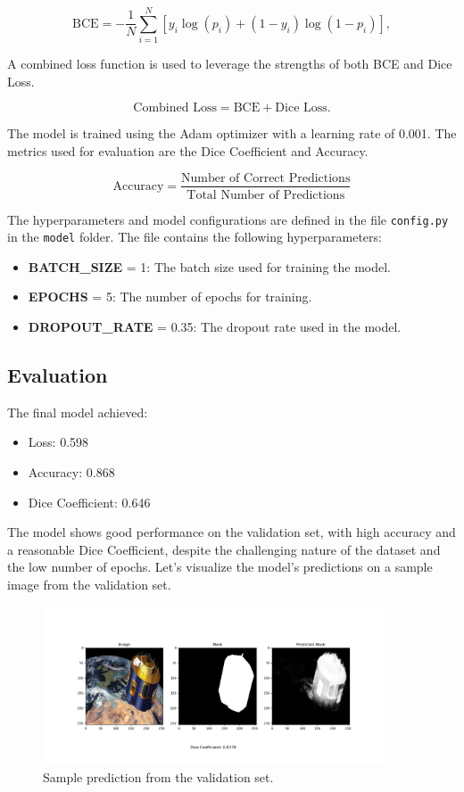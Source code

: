\documentclass{article}
\begin{document}
\[
\text{BCE} = -\frac{1}{N} \sum_{i=1}^{N} [y_i \log(p_i) + (1 - y_i) \log(1 - p_i)],
\]

A combined loss function is used to leverage the strengths of both BCE and Dice Loss.

\[
\text{Combined Loss} = \text{BCE} + \text{Dice Loss}.
\]

The model is trained using the Adam optimizer with a learning rate of 0.001. The metrics used for evaluation 
are the Dice Coefficient and Accuracy.

\[
\text{Accuracy} = \frac{\text{Number of Correct Predictions}}{\text{Total Number of Predictions}}
\]
\vspace{1em}

The hyperparameters and model configurations are defined in the file \texttt{config.py} in the \texttt{model} folder.
The file contains the following hyperparameters:
 
\begin{itemize}
    \item \textbf{BATCH\_SIZE} = 1: The batch size used for training the model.
    \item \textbf{EPOCHS} = 5: The number of epochs for training.
    \item \textbf{DROPOUT\_RATE} = 0.35: The dropout rate used in the model.
\end{itemize}

\subsection{Evaluation}
The final model achieved:
\begin{itemize}
    \item Loss: 0.598
    \item Accuracy: 0.868
    \item Dice Coefficient: 0.646
\end{itemize}

The model shows good performance on the validation set, with high accuracy and a reasonable Dice Coefficient, 
despite the challenging nature of the dataset and the low number of epochs. Let's visualize the model's 
predictions on a sample image from the validation set.

\begin{figure}[h]
    \centering
    \includegraphics[width=0.9\textwidth]{../images/output_sample.png}
    \caption{Sample prediction from the validation set.}
    \label{fig:sample_predictions}
\end{figure}
\end{document}

